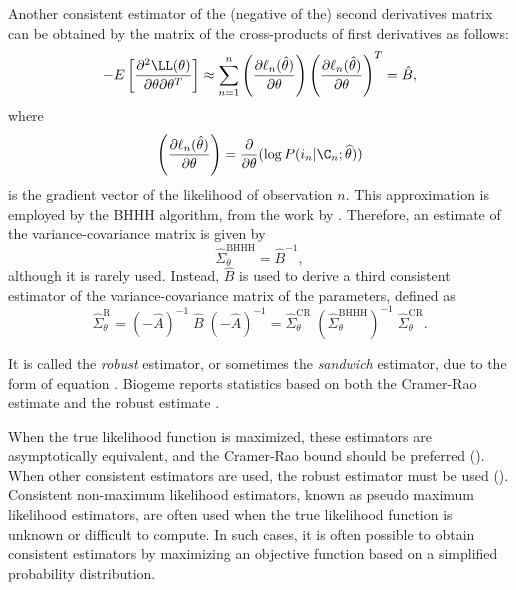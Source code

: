 \documentclass[12pt,a4paper]{article}
\begin{document}
Another consistent estimator of the (negative of the) second
derivatives matrix can be obtained by the matrix of the cross-products of first derivatives as follows:
\begin{equation}
\label{eq:binaryBHHH}
-E\left[ \frac{\partial^2 \LL(\theta)}{\partial \theta \partial \theta^T}\right] \approx  \sum_{n=1}^n \left(\frac{\partial \ell_n(\hat{\theta})}{\partial \theta} \right)\left(\frac{\partial \ell_n(\hat{\theta})}{\partial \theta} \right)^T = \hat{B},
\end{equation}
 where
\begin{equation}
\left(\frac{\partial \ell_n(\hat{\theta})}{\partial \theta} \right) = \frac{\partial}{\partial \theta} (\log P(i_n|\C_n;\widehat{\theta}))
\end{equation}
is the gradient vector of the likelihood of observation $n$.
This approximation is employed by the BHHH algorithm, from the work by . Therefore, an estimate of the variance-covariance matrix 
is given by 
\begin{equation}
\widehat{\Sigma}^{\text{BHHH}}_{\theta} =\hat{B}^{-1},
\end{equation}
 although it is rarely used. 
Instead, $\hat{B}$ is
used to derive  a third consistent estimator of the variance-covariance matrix of
the parameters, defined as
\begin{equation}
\label{eq:robustEstimator}
\widehat{\Sigma}^{\text{R}}_{\theta} = (-\hat{A})^{-1} \; \widehat{B}\; (-\hat{A})^{-1} = \widehat{\Sigma}^{\text{CR}}_{\theta} \; (\widehat{\Sigma}^{\text{BHHH}}_{\theta})^{-1} \; \widehat{\Sigma}^{\text{CR}}_{\theta}.
\end{equation}

It is
called the \emph{robust} estimator, or sometimes the \emph{sandwich}
estimator, due to the form of equation
. Biogeme reports statistics based on  both the Cramer-Rao estimate
 and the robust estimate .


 When the true likelihood function is maximized,  these estimators are
 asymptotically equivalent, and the Cramer-Rao bound should be
preferred (\cite{KaueCarr2001}).  When other consistent estimators are
used, the robust estimator must be used
(\cite{Whit82}). Consistent non-maximum likelihood estimators, known
as pseudo maximum likelihood estimators, are often used when the true
likelihood function is unknown or difficult to compute. In such cases,
it is often possible to obtain consistent estimators by maximizing an
objective function based on a simplified probability distribution. 
\end{document}
